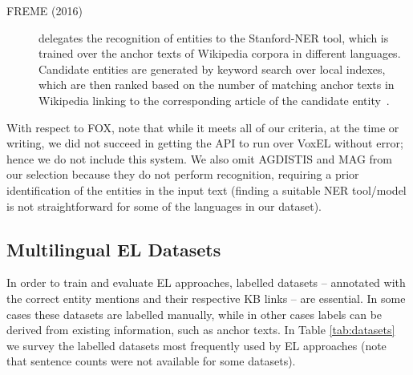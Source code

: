 \documentclass{llncs}
\begin{document}
\begin{description}
\item[FREME (2016)] delegates the recognition of entities to the Stanford-NER tool, which is trained over the anchor texts of Wikipedia corpora in different languages. Candidate entities are generated by keyword search over local indexes, which are then ranked based on the number of matching anchor texts in Wikipedia linking to the corresponding article of the candidate entity~\cite{freme-ner2016}.
\end{description}

With respect to FOX, note that while it meets all of our criteria, at the time or writing, we did not succeed in getting the API to run over VoxEL without error; hence we do not include this system. We also omit AGDISTIS and MAG from our selection because they do not perform recognition, requiring a prior identification of the entities in the input text (finding a suitable NER tool/model is not straightforward for some of the languages in our dataset).




\subsection{Multilingual EL Datasets}

In order to train and evaluate EL approaches, labelled datasets -- annotated with the correct entity mentions and their respective KB links -- are essential. In some cases these datasets are labelled manually, while in other cases labels can be derived from existing information, such as anchor texts. In Table \ref{tab:datasets} we survey the labelled datasets most frequently used by EL approaches (note that sentence counts were not available for some datasets).
\end{document}
